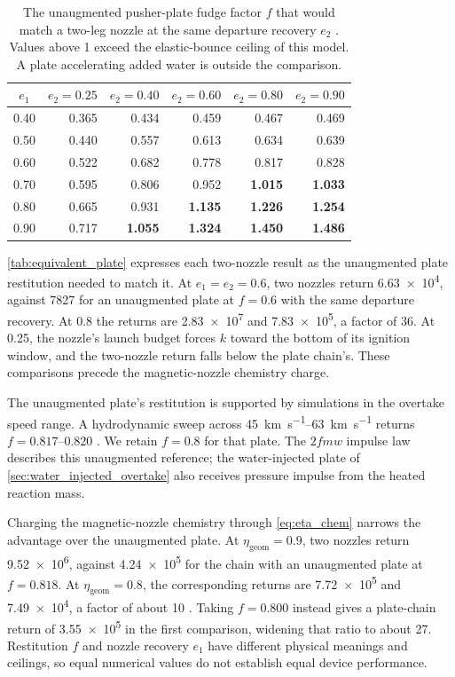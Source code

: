 \documentclass{article}
\begin{document}
\begin{table}[!htpb]
    \centering
    \caption{The unaugmented pusher-plate fudge factor $f$ that would match a two-leg nozzle at the same departure recovery $e_2$ \cite{Katz_aim_is_all_you_need_2025}. Values above 1 exceed the elastic-bounce ceiling of this model. A plate accelerating added water is outside the comparison.}
    \label{tab:equivalent_plate}
    \begin{tabular}{|c|r|r|r|r|r|}\hline
        \textbf{$e_1$} & \textbf{$e_2=0.25$} & \textbf{$e_2=0.40$} & \textbf{$e_2=0.60$} & \textbf{$e_2=0.80$} & \textbf{$e_2=0.90$} \\\hline
        0.40 & 0.365 & 0.434 & 0.459 & 0.467 & 0.469 \\\hline
        0.50 & 0.440 & 0.557 & 0.613 & 0.634 & 0.639 \\\hline
        0.60 & 0.522 & 0.682 & 0.778 & 0.817 & 0.828 \\\hline
        0.70 & 0.595 & 0.806 & 0.952 & \textbf{1.015} & \textbf{1.033} \\\hline
        0.80 & 0.665 & 0.931 & \textbf{1.135} & \textbf{1.226} & \textbf{1.254} \\\hline
        0.90 & 0.717 & \textbf{1.055} & \textbf{1.324} & \textbf{1.450} & \textbf{1.486} \\\hline
    \end{tabular}
\end{table}

\autoref{tab:equivalent_plate} expresses each two-nozzle result as the unaugmented plate restitution needed to match it. At $e_1=e_2=0.6$, two nozzles return \num{6.63e4}, against \num{7827} for an unaugmented plate at $f=0.6$ with the same departure recovery. At 0.8 the returns are \num{2.83e7} and \num{7.83e5}, a factor of 36. At 0.25, the nozzle's launch budget forces $k$ toward the bottom of its ignition window, and the two-nozzle return falls below the plate chain's. These comparisons precede the magnetic-nozzle chemistry charge.

The unaugmented plate's restitution is supported by simulations in the overtake speed range. A hydrodynamic sweep across \SIrange{45}{63}{\kilo\meter\per\second} returns $f=\numrange{0.817}{0.820}$ \cite{Katz_puffsat_impact_sim_2026}. We retain $f=0.8$ for that plate. The $2fmw$ impulse law describes this unaugmented reference; the water-injected plate of \autoref{sec:water_injected_overtake} also receives pressure impulse from the heated reaction mass.

Charging the magnetic-nozzle chemistry through \autoref{eq:eta_chem} narrows the advantage over the unaugmented plate. At $\eta_{\mathrm{geom}}=0.9$, two nozzles return \num{9.52e6}, against \num{4.24e5} for the chain with an unaugmented plate at $f=0.818$. At $\eta_{\mathrm{geom}}=0.8$, the corresponding returns are \num{7.72e5} and \num{7.49e4}, a factor of about 10 \cite{Katz_aim_is_all_you_need_2025}. Taking $f=0.800$ instead gives a plate-chain return of \num{3.55e5} in the first comparison, widening that ratio to about 27. Restitution $f$ and nozzle recovery $e_1$ have different physical meanings and ceilings, so equal numerical values do not establish equal device performance.
\end{document}
